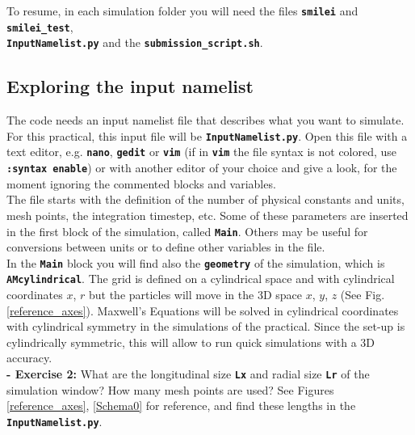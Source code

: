 \documentclass[a4paper,12pt]{extarticle}
\newcommand{\commandline}[1]{\texttt{\textbf{#1}}}
\begin{document}
To resume, in each simulation folder you will need the files \commandline{smilei} and \commandline{smilei\_test},\\ \commandline{InputNamelist.py} and the \commandline{submission\_script.sh}.

\subsection{Exploring the input namelist}
The code needs an input namelist file that describes what you want to simulate. For this practical, this input file will be \commandline{InputNamelist.py}.
Open this file with a text editor, e.g. \commandline{nano}, \commandline{gedit} or \commandline{vim} (if in \commandline{vim} the file syntax is not colored, use \commandline{:syntax enable}) or with another editor of your choice and give a look, for the moment ignoring the commented blocks and variables. \\

The file starts with the definition of the number of physical constants and units, mesh points, the integration timestep, etc.  Some of these parameters are inserted in the first block of the simulation, called \commandline{Main}. Others may be useful for conversions between units or to define other variables in the file.\\

In the  \commandline{Main} block you will find also the  \commandline{geometry} of the simulation, which is \commandline{AMcylindrical}. The grid is  defined on a cylindrical space and with cylindrical coordinates $x$, $r$ but the particles will move in the 3D  space $x$, $y$, $z$ (See Fig. \ref{reference_axes}). Maxwell's Equations will be solved in cylindrical coordinates with cylindrical symmetry in the simulations of the practical.  Since the set-up is cylindrically symmetric,  this will allow to run quick simulations with a 3D accuracy.\\

\textbf{ - Exercise 2:} What are the longitudinal size \commandline{Lx} and radial size \commandline{Lr} of the simulation window? How many mesh points are used? See Figures \ref{reference_axes}, \ref{Schema0} for reference,  and find these lengths in the \commandline{InputNamelist.py}.
\end{document}
